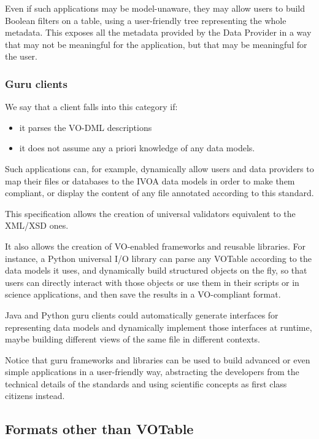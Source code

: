 \documentclass[11pt,a4paper]{ivoa}
\begin{document}
Even if such applications may be model-unaware, they may allow users to
build Boolean filters on a table, using a user-friendly tree
representing the whole metadata. This exposes all the metadata provided
by the Data Provider in a way that may not be meaningful for the
application, but that may be meaningful for the user.

\subsubsection{Guru clients}\label{guru-clients}

We say that a client falls into this category if:

\begin{itemize}
\item
  it parses the VO-DML descriptions
\item
  it does not assume any a priori knowledge of any data models.
\end{itemize}

Such applications can, for example, dynamically allow users and data
providers to map their files or databases to the IVOA data models in
order to make them compliant, or display the content of any file
annotated according to this standard.

This specification allows the creation of universal validators
equivalent to the XML/XSD ones.

It also allows the creation of VO-enabled frameworks and reusable
libraries. For instance, a Python universal I/O library can parse any
VOTable according to the data models it uses, and dynamically build
structured objects on the fly, so that users can directly interact with
those objects or use them in their scripts or in science applications,
and then save the results in a VO-compliant format.

Java and Python guru clients could automatically generate interfaces for
representing data models and dynamically implement those interfaces at
runtime, maybe building different views of the same file in different
contexts.

Notice that guru frameworks and libraries can be used to build advanced
or even simple applications in a user-friendly way, abstracting the
developers from the technical details of the standards and using
scientific concepts as first class citizens instead.

\subsection{Formats other than VOTable}\label{sec:other-formats}
\end{document}
